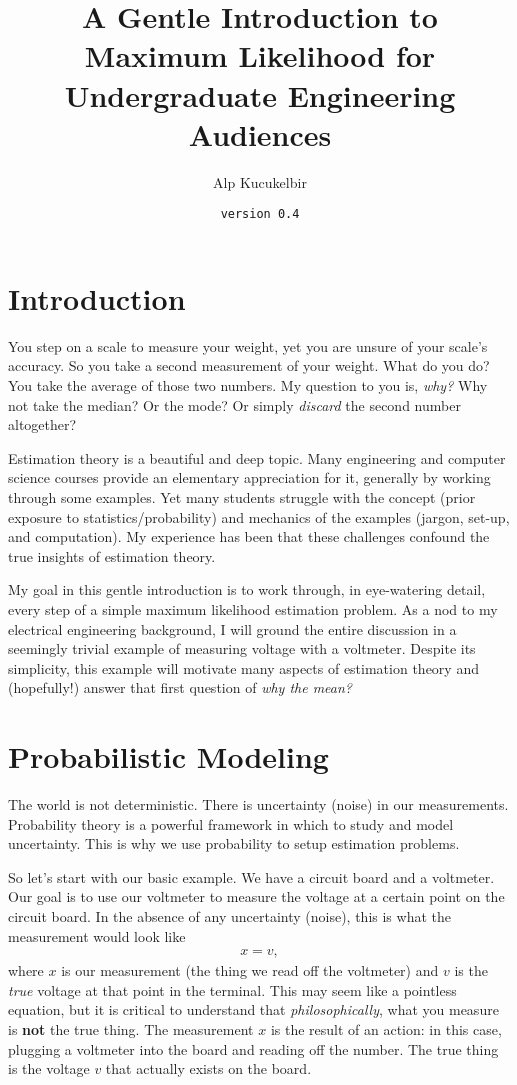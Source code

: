 \documentclass[10pt,letterpaper]{article}
\title{\textbf{A Gentle Introduction to Maximum Likelihood \break for Undergraduate Engineering Audiences}}
\author{Alp Kucukelbir}
\date{\texttt{version 0.4}}
\begin{document}
\maketitle

\section{Introduction}
You step on a scale to measure your weight, yet you are unsure of your scale's accuracy. So you take a second measurement of your weight. What do you do? You take the average of those two numbers. My question to you is, \emph{why?} Why not take the median? Or the mode? Or simply \emph{discard} the second number altogether? 

Estimation theory is a beautiful and deep topic. Many  engineering and computer science courses provide an elementary appreciation for it, generally by working through some examples. Yet many students struggle with the concept (prior exposure to statistics/probability) and mechanics of the examples (jargon, set-up, and computation). My experience has been that these challenges confound the true insights of estimation theory.

My goal in this gentle introduction is to work through, in eye-watering detail, every step of a simple maximum likelihood estimation problem. As a nod to my electrical engineering background, I will ground the entire discussion in a seemingly trivial example of measuring voltage with a voltmeter. Despite its simplicity, this example will motivate many aspects of estimation theory and (hopefully!) answer that first question of \emph{why the mean?}

\section{Probabilistic Modeling}
The world is not deterministic. There is uncertainty (noise) in our measurements. Probability theory is a powerful framework in which to study and model uncertainty. This is why we use probability to setup estimation problems.

So let's start with our basic example. We have a circuit board and a voltmeter. Our goal is to use our voltmeter to measure the voltage at a certain point on the circuit board. In the absence of any uncertainty (noise), this is what the measurement would look like
\begin{align}
	x = v,\label{relationshipModel}
\end{align}
where $x$ is our measurement (the thing we read off the voltmeter) and $v$ is the \emph{true} voltage at that point in the terminal. This may seem like a pointless equation, but it is critical to understand that \emph{philosophically}, what you measure is \textbf{not} the true thing. The measurement $x$ is the result of an action: in this case, plugging a voltmeter into the board and reading off the number. The true thing is the voltage $v$ that actually exists on the board.
\end{document}
